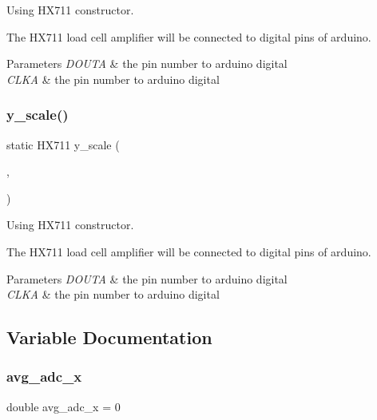 Using H\+X711 constructor. 

The H\+X711 load cell amplifier will be connected to digital pins of arduino. 
\begin{DoxyParams}{Parameters}
{\em D\+O\+U\+TA} & the pin number to arduino digital \\
\hline
{\em C\+L\+KA} & the pin number to arduino digital \\
\hline
\end{DoxyParams}
\mbox{\label{windsensor_8ino_aff383f74e82e01501521b84d1bc001e2}} 
\subsubsection{\texorpdfstring{y\+\_\+scale()}{y\_scale()}}
{\footnotesize\ttfamily static H\+X711 y\+\_\+scale (\begin{DoxyParamCaption}\item[{\mbox{\hyperlink{windsensor_8ino_a3d0814fa8af472164fbf0843faa35d5c}{D\+O\+U\+TB}}}]{,  }\item[{\mbox{\hyperlink{windsensor_8ino_aeeac7c3e17c81d104245d857c7bd184f}{C\+L\+KB}}}]{ }\end{DoxyParamCaption})\hspace{0.3cm}{\ttfamily [static]}}



Using H\+X711 constructor. 

The H\+X711 load cell amplifier will be connected to digital pins of arduino. 
\begin{DoxyParams}{Parameters}
{\em D\+O\+U\+TA} & the pin number to arduino digital \\
\hline
{\em C\+L\+KA} & the pin number to arduino digital \\
\hline
\end{DoxyParams}


\subsection{Variable Documentation}
\mbox{\label{windsensor_8ino_a4e68dc721cdeec90403f8d51073a0ff7}} 
\subsubsection{\texorpdfstring{avg\+\_\+adc\+\_\+x}{avg\_adc\_x}}
{\footnotesize\ttfamily double avg\+\_\+adc\+\_\+x = 0\hspace{0.3cm}{\ttfamily [static]}}



